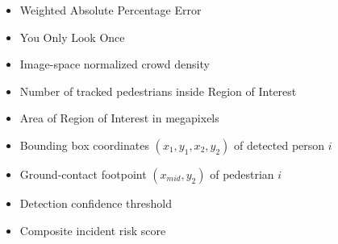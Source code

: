 \begin{itemize}
	\item[\textbf{WAPE}] Weighted Absolute Percentage Error
	\item[\textbf{YOLO}] You Only Look Once
	\item[$\rho_{img}$] Image-space normalized crowd density
	\item[$N_{ROI}$] Number of tracked pedestrians inside Region of Interest
	\item[$A_{ROI}$] Area of Region of Interest in megapixels
	\item[$\mathcal{B}_i$] Bounding box coordinates $(x_1, y_1, x_2, y_2)$ of detected person $i$
	\item[$\mathcal{F}_i$] Ground-contact footpoint $(x_{mid}, y_2)$ of pedestrian $i$
	\item[$\theta_{conf}$] Detection confidence threshold
	\item[$R_{incident}$] Composite incident risk score
\end{itemize}
